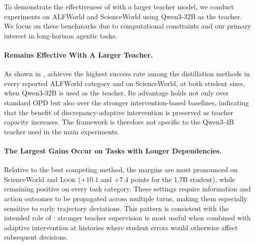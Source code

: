 To demonstrate the effectiveness of \name with a larger teacher model, we conduct experiments on ALFWorld and ScienceWorld using Qwen3-32B as the teacher. 
We focus on these benchmarks due to computational constraints and our primary interest in long-horizon agentic tasks.

\paragraph{\name Remains Effective With A Larger Teacher.} 
As shown in , \name achieves the highest success rate among the
distillation methods in every reported ALFWorld category and on ScienceWorld, at both student
sizes, when Qwen3-32B is used as the teacher. Its advantage holds not only over standard OPD but also over the stronger intervention-based baselines, indicating that the benefit of discrepancy-adaptive intervention is preserved as teacher capacity increases. The framework is therefore not specific to the Qwen3-4B teacher used in the main experiments. 

\paragraph{The Largest Gains Occur on Tasks with Longer Dependencies.}
Relative to the best competing method, the margins are most pronounced on ScienceWorld and
\textsc{Look} ($+10.1$ and $+7.4$ points for the 1.7B student), while remaining positive on every
task category. These settings require information and action outcomes to be propagated across multiple turns, making them especially sensitive to early trajectory deviations. This pattern is consistent with the intended role of \name: stronger teacher supervision is most useful when combined with adaptive intervention at histories where student errors would otherwise affect subsequent decisions. 

